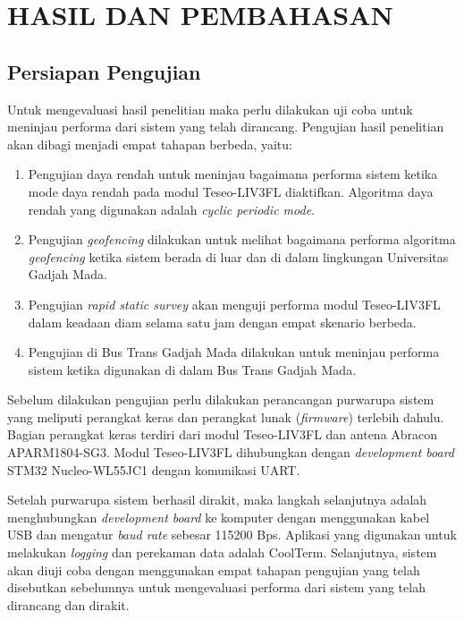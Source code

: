 \chapter{HASIL DAN PEMBAHASAN}

\section{Persiapan Pengujian}
Untuk mengevaluasi hasil penelitian maka perlu dilakukan uji coba untuk meninjau performa dari sistem yang telah dirancang. Pengujian hasil penelitian akan dibagi menjadi empat tahapan berbeda, yaitu:

\begin{enumerate}
	\item Pengujian daya rendah untuk meninjau bagaimana performa sistem ketika mode daya rendah pada modul Teseo-LIV3FL diaktifkan. Algoritma daya rendah yang digunakan adalah \textit{cyclic periodic mode}.
	\item Pengujian \textit{geofencing} dilakukan untuk melihat bagaimana performa algoritma \textit{geofencing} ketika sistem berada di luar dan di dalam lingkungan Universitas Gadjah Mada.
	\item Pengujian \textit{rapid static survey} akan menguji performa modul Teseo-LIV3FL dalam keadaan diam selama satu jam dengan empat skenario berbeda.
	\item Pengujian di Bus Trans Gadjah Mada dilakukan untuk meninjau performa sistem ketika digunakan di dalam Bus Trans Gadjah Mada.
\end{enumerate}

Sebelum dilakukan pengujian perlu dilakukan perancangan purwarupa sistem yang meliputi perangkat keras dan perangkat lunak (\textit{firmware}) terlebih dahulu. Bagian perangkat keras terdiri dari modul Teseo-LIV3FL dan antena Abracon APARM1804-SG3. Modul Teseo-LIV3FL dihubungkan dengan \textit{development board} STM32 Nucleo-WL55JC1 dengan komunikasi UART.

Setelah purwarupa sistem berhasil dirakit, maka langkah selanjutnya adalah menghubungkan \textit{development board} ke komputer dengan menggunakan kabel USB dan mengatur \textit{baud rate} sebesar 115200 Bps. Aplikasi yang digunakan untuk melakukan \textit{logging} dan perekaman data adalah CoolTerm. Selanjutnya, sistem akan diuji coba dengan menggunakan empat tahapan pengujian yang telah disebutkan sebelumnya untuk mengevaluasi performa dari sistem yang telah dirancang dan dirakit.

